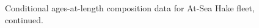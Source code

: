 \documentclass[
]{scrartcl}
\begin{document}
\begin{figure}[H]


\caption{\label{fig-caal_flt6_2}Conditional ages-at-length composition
data for At-Sea Hake fleet, continued.}

\end{figure}%
\end{document}
